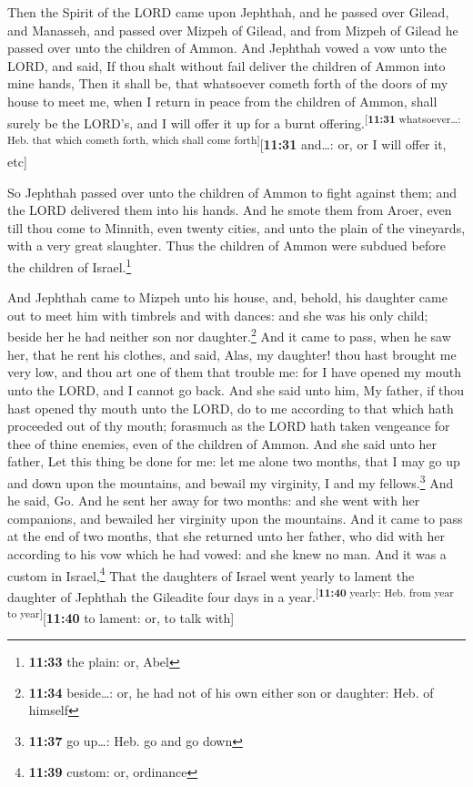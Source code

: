  Then the Spirit of the LORD came upon Jephthah, and he
passed over Gilead, and Manasseh, and passed over Mizpeh of Gilead, and
from Mizpeh of Gilead he passed over unto the children of Ammon.
 And Jephthah vowed a vow unto the LORD, and said, If
thou shalt without fail deliver the children of Ammon into mine hands,
 Then it shall be, that whatsoever cometh forth of the
doors of my house to meet me, when I return in peace from the children
of Ammon, shall surely be the LORD's, and I will offer it up for a burnt
offering.\textsuperscript{{[}\textbf{11:31} whatsoever\ldots: Heb. that
which cometh forth, which shall come forth{]}}{[}\textbf{11:31}
and\ldots: or, or I will offer it, etc{]}

 So Jephthah passed over unto the children of Ammon to
fight against them; and the LORD delivered them into his hands.
 And he smote them from Aroer, even till thou come to
Minnith, even twenty cities, and unto the plain of the vineyards, with a
very great slaughter. Thus the children of Ammon were subdued before the
children of Israel.\footnote{\textbf{11:33} the plain: or, Abel}

 And Jephthah came to Mizpeh unto his house, and, behold,
his daughter came out to meet him with timbrels and with dances: and she
was his only child; beside her he had neither son nor
daughter.\footnote{\textbf{11:34} beside\ldots: or, he had not of his
  own either son or daughter: Heb. of himself}  And it
came to pass, when he saw her, that he rent his clothes, and said, Alas,
my daughter! thou hast brought me very low, and thou art one of them
that trouble me: for I have opened my mouth unto the LORD, and I cannot
go back.  And she said unto him, My father, if thou hast
opened thy mouth unto the LORD, do to me according to that which hath
proceeded out of thy mouth; forasmuch as the LORD hath taken vengeance
for thee of thine enemies, even of the children of Ammon.
 And she said unto her father, Let this thing be done for
me: let me alone two months, that I may go up and down upon the
mountains, and bewail my virginity, I and my fellows.\footnote{\textbf{11:37}
  go up\ldots: Heb. go and go down}  And he said, Go. And
he sent her away for two months: and she went with her companions, and
bewailed her virginity upon the mountains.  And it came
to pass at the end of two months, that she returned unto her father, who
did with her according to his vow which he had vowed: and she knew no
man. And it was a custom in Israel,\footnote{\textbf{11:39} custom: or,
  ordinance}  That the daughters of Israel went yearly to
lament the daughter of Jephthah the Gileadite four days in a
year.\textsuperscript{{[}\textbf{11:40} yearly: Heb. from year to
year{]}}{[}\textbf{11:40} to lament: or, to talk with{]}

